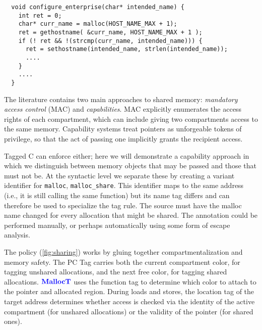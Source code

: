 \documentclass{llncs}
\begin{document}
{

\begin{verbatim}
  void configure_enterprise(char* intended_name) {
    int ret = 0;
    char* curr_name = malloc(HOST_NAME_MAX + 1);
    ret = gethostname( &curr_name, HOST_NAME_MAX + 1 );
    if (! ret && !(strcmp(curr_name, intended_name))) {
      ret = sethostname(intended_name, strlen(intended_name));
      ....
    }
    ....
  }
\end{verbatim}

The literature contains two main approaches to shared memory:
{\em mandatory access control} (MAC) and {\em capabilities}.
MAC explicitly
enumerates the access rights of each compartment, which can include giving two
compartments access to the same memory. Capability systems treat
pointers as unforgeable tokens of privilege, so that the act of passing one
implicitly grants the recipient access.

Tagged C can enforce either; here we will demonstrate a capability approach
in which we distinguish between memory objects that may be passed and those that must not be.
At the syntactic level we separate these by creating a variant identifier for {\tt malloc},
{\tt malloc\_share}. This identifier maps to the same address (i.e., it is still calling the same function)
but its name tag differs and can therefore be used to specialize the tag rule. The source
must have the malloc name changed for every allocation that might be shared.
The annotation could be performed manually, or perhaps automatically using some form
of escape analysis.

The policy (\cref{fig:sharing}) works by gluing together compartmentalization and memory safety.
The PC Tag carries both the current compartment color, for tagging unshared allocations, and the next free color, for tagging shared allocations.
\(\color{blue} \mathbf{MallocT}\) uses the function tag to determine which color to attach to the pointer and allocated
region. During loads and stores, the location tag of the target address
determines whether access is checked via the identity of the active compartment (for unshared allocations) or
the validity of the pointer (for shared ones).

}
\end{document}
